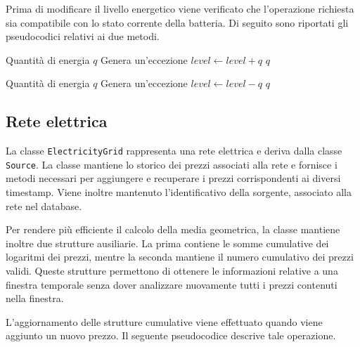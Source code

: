 \documentclass[a4paper,oneside,italian]{sapthesis}
\begin{document}
Prima di modificare il livello energetico viene verificato che l'operazione
richiesta sia compatibile con lo stato corrente della batteria. Di seguito
sono riportati gli pseudocodici relativi ai due metodi.

\begin{algorithm}[H]
\caption{Caricamento della batteria}
\label{alg:battery-charge}
\begin{algorithmic}[1]
\Require Quantità di energia $q$
    \State Genera un'eccezione
\Else
    \State $level \gets level + q$
\EndIf
\State \Return $q$
\end{algorithmic}
\end{algorithm}

\begin{algorithm}[H]
\caption{Scaricamento della batteria}
\label{alg:battery-discharge}
\begin{algorithmic}[1]
\Require Quantità di energia $q$
    \State Genera un'eccezione
\Else
    \State $level \gets level - q$
\EndIf
\State \Return $q$
\end{algorithmic}
\end{algorithm}

\subsection{Rete elettrica}

La classe \texttt{ElectricityGrid} rappresenta una rete elettrica e deriva
dalla classe \texttt{Source}. La classe mantiene lo storico dei prezzi
associati alla rete e fornisce i metodi necessari per aggiungere e recuperare
i prezzi corrispondenti ai diversi timestamp. Viene inoltre mantenuto
l'identificativo della sorgente, associato alla rete nel database.

Per rendere più efficiente il calcolo della media geometrica, la classe
mantiene inoltre due strutture ausiliarie. La prima contiene le somme
cumulative dei logaritmi dei prezzi, mentre la seconda mantiene il numero
cumulativo dei prezzi validi. Queste strutture permettono di ottenere le
informazioni relative a una finestra temporale senza dover analizzare
nuovamente tutti i prezzi contenuti nella finestra.

L'aggiornamento delle strutture cumulative viene effettuato quando viene
aggiunto un nuovo prezzo. Il seguente pseudocodice descrive tale operazione.
\end{document}
